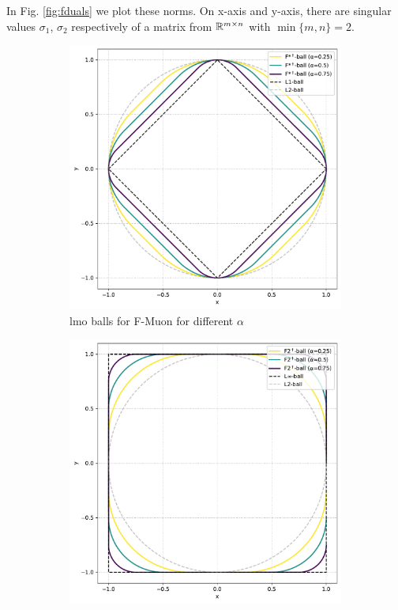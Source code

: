 \documentclass{article} %
\newcommand{\Rmn}{\R^{m\times n}}
\begin{document}
In Fig. \cref{fig:fduals} we plot these norms. On x-axis and y-axis, there are singular values $\sigma_1$, $\sigma_2$ respectively of a matrix from $\Rmn$ with $\min\{m,n\}=2$.

\begin{figure}[h!]
    \centering
    \begin{subfigure}[b]{0.48\linewidth}
        \centering
        \includegraphics[width=\linewidth]{fstardualball.pdf}
        \caption{lmo balls for F-Muon for different $\alpha$}
        \label{fig:fstardual}
    \end{subfigure}
    \hfill
    \begin{subfigure}[b]{0.48\linewidth}
        \centering
        \includegraphics[width=\linewidth]{ftwodualball.pdf}

\end{subfigure}
\end{figure}
\end{document}
